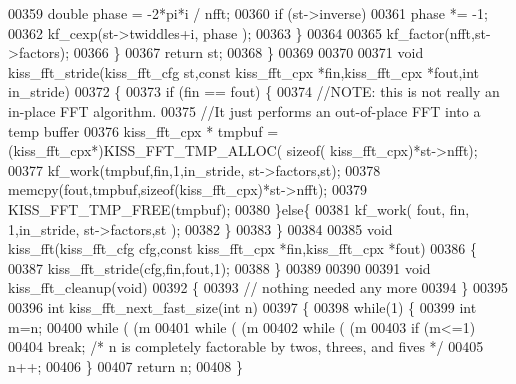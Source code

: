 \begin{DoxyCode}
00359             \textcolor{keywordtype}{double} phase = -2*pi*i / nfft;
00360             \textcolor{keywordflow}{if} (st->inverse)
00361                 phase *= -1;
00362             kf_cexp(st->twiddles+i, phase );
00363         \}
00364 
00365         kf_factor(nfft,st->factors);
00366     \}
00367     \textcolor{keywordflow}{return} st;
00368 \}
00369 
00370 
00371 \textcolor{keywordtype}{void} kiss_fft_stride(kiss_fft_cfg st,\textcolor{keyword}{const} kiss_fft_cpx *fin,kiss_fft_cpx *fout,\textcolor{keywordtype}{int} in\_stride)
00372 \{
00373     \textcolor{keywordflow}{if} (fin == fout) \{
00374         \textcolor{comment}{//NOTE: this is not really an in-place FFT algorithm.}
00375         \textcolor{comment}{//It just performs an out-of-place FFT into a temp buffer}
00376         kiss_fft_cpx * tmpbuf = (kiss_fft_cpx*)KISS_FFT_TMP_ALLOC( \textcolor{keyword}{sizeof}(
      kiss_fft_cpx)*st->nfft);
00377         kf_work(tmpbuf,fin,1,in\_stride, st->factors,st);
00378         memcpy(fout,tmpbuf,\textcolor{keyword}{sizeof}(kiss_fft_cpx)*st->nfft);
00379         KISS_FFT_TMP_FREE(tmpbuf);
00380     \}\textcolor{keywordflow}{else}\{
00381         kf_work( fout, fin, 1,in\_stride, st->factors,st );
00382     \}
00383 \}
00384 
00385 \textcolor{keywordtype}{void} kiss_fft(kiss_fft_cfg cfg,\textcolor{keyword}{const} kiss_fft_cpx *fin,kiss_fft_cpx *fout)
00386 \{
00387     kiss_fft_stride(cfg,fin,fout,1);
00388 \}
00389 
00390 
00391 \textcolor{keywordtype}{void} kiss_fft_cleanup(\textcolor{keywordtype}{void})
00392 \{
00393     \textcolor{comment}{// nothing needed any more}
00394 \}
00395 
00396 \textcolor{keywordtype}{int} kiss_fft_next_fast_size(\textcolor{keywordtype}{int} n)
00397 \{
00398     \textcolor{keywordflow}{while}(1) \{
00399         \textcolor{keywordtype}{int} m=n;
00400         \textcolor{keywordflow}{while} ( (m%
00401         \textcolor{keywordflow}{while} ( (m%
00402         \textcolor{keywordflow}{while} ( (m%
00403         \textcolor{keywordflow}{if} (m<=1)
00404             \textcolor{keywordflow}{break}; \textcolor{comment}{/* n is completely factorable by twos, threes, and fives */}
00405         n++;
00406     \}
00407     \textcolor{keywordflow}{return} n;
00408 \}
\end{DoxyCode}
